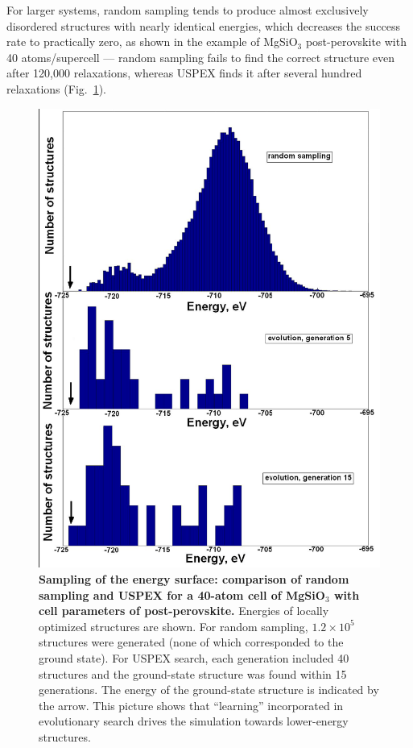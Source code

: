 \documentclass[12pt]{article}
\begin{document}
For larger systems, random sampling tends to produce almost exclusively
disordered structures with nearly identical energies, which decreases the
success rate to practically zero, as shown in the example of MgSiO$_3$
post-perovskite with 40 atoms/supercell --- random sampling fails to find the
correct structure even after 120,000 relaxations, whereas USPEX finds it
after several hundred relaxations (Fig.~\ref{fig:MgSiO3_40atoms}).

\begin{figure}[hbtp] \centering
\includegraphics[scale=0.3]{pic/Sampling_of_the_energy_surface.png}
\caption{\footnotesize \textbf{Sampling of the energy surface: comparison of
random sampling and USPEX for a 40-atom cell of MgSiO$_3$ with cell parameters
of post-perovskite.} Energies of locally optimized structures are shown. For
random sampling, $1.2\times 10^{5}$ structures were generated (none of which
corresponded to the ground state). For USPEX search, each generation included 40
structures and the ground-state structure was found within 15 generations. The
energy of the ground-state structure is indicated by the arrow. This picture
shows that ``learning'' incorporated in evolutionary search drives the
simulation towards lower-energy structures.}
\label{fig:MgSiO3_40atoms}
\end{figure}
\end{document}
